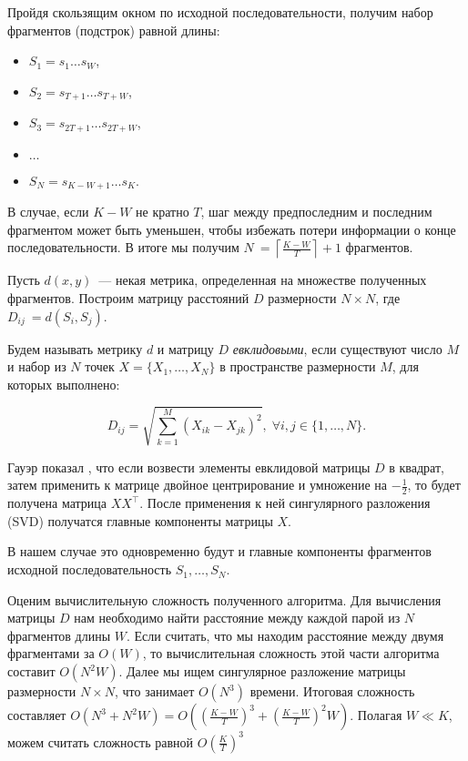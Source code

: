 Пройдя скользящим окном по исходной последовательности, получим набор фрагментов (подстрок) равной длины:

\begin{itemize}
  \item $S_1 = s_1\ldots s_W$,
  \item $S_2 = s_{T+1}\ldots s_{T+W}$,
  \item $S_3 = s_{2T+1}\ldots s_{2T + W}$,
  \item $\ldots$
  \item $S_N = s_{K-W+1}\ldots s_K$.
\end{itemize}

В случае, если $K-W$ не кратно $T$, шаг между предпоследним и последним фрагментом может быть уменьшен, чтобы избежать потери информации о конце последовательности. В итоге мы получим $N~= \left\lceil\frac{K-W}{T}\right\rceil + 1$ фрагментов.

Пусть $d(x,y)$~--- некая метрика, определенная на множестве полученных фрагментов. Построим матрицу расстояний $D$ размерности $N\times N$, где $D_{ij}~= d(S_i, S_j)$.

Будем называть метрику $d$ и матрицу $D$ \textit{евклидовыми}, если существуют число $M$ и набор из $N$ точек $X = \{X_1,\ldots,X_N\}$ в пространстве размерности $M$, для которых выполнено:

$$D_{ij} = \sqrt{\sum_{k=1}^M \left(X_{ik} - X_{jk}\right)^2}, \; \forall i, j \in \{1,\ldots, N\}.$$

Гауэр показал \cite{Gower1966}, что если возвести элементы евклидовой матрицы $D$ в квадрат, затем применить к матрице двойное центрирование и умножение на $-\frac{1}{2}$, то будет получена матрица $XX^\top$. После применения к ней сингулярного разложения (SVD) получатся главные компоненты матрицы $X$.

В нашем случае это одновременно будут и главные компоненты фрагментов исходной последовательность $S_1,\ldots,S_N$.

Оценим вычислительную сложность полученного алгоритма. Для вычисления матрицы $D$ нам необходимо найти расстояние между каждой парой из $N$ фрагментов длины $W$. Если считать, что мы находим расстояние между двумя фрагментами за $O(W)$, то вычислительная сложность этой части алгоритма составит $O(N^2W)$. Далее мы ищем сингулярное разложение матрицы размерности $N\times N$, что занимает $O(N^3)$ времени. Итоговая сложность составляет $O(N^3 + N^2W) = O\left(\left(\frac{K-W}{T}\right)^3 + \left(\frac{K-W}{T}\right)^2W\right)$. Полагая $W \ll K$, можем считать сложность равной $O\left(\frac{K}{T}\right)^3$


